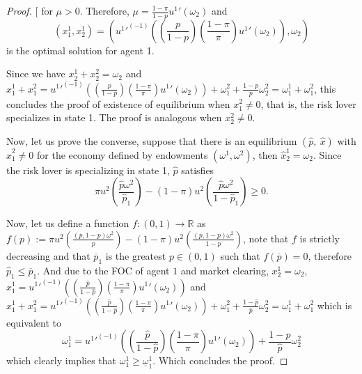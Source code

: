 \documentclass[pdftex]{article}
\numberwithin{equation}{section}
\theoremstyle{th}
\newtheorem{proof lemma}{{Proof Lemma}.}
\theoremstyle{definition}
\begin{document}
{\begin{proof}{[}
for $\mu>0$. Therefore, $\mu=\frac{1-\pi}{1-p}{u^{1}}'(\omega_{2})$
and 
\[
\left(x_{1}^{1},x_{2}^{1}\right)=\left({{u^{1}}'}^{\left(-1\right)}\left(\left(\frac{p}{1-p}\right)\left(\frac{1-\pi}{\pi}\right){u^{1}}'\left(\omega_{2}\right)\right),\omega_{2}\right)
\]
 is the optimal solution for agent 1. 

Since we have $x_{2}^{1}+x_{2}^{2}=\omega_{2}$ and $x_{1}^{1}+x_{1}^{2}={{u^{1}}'}^{\left(-1\right)}\left(\left(\frac{p}{1-p}\right)\left(\frac{1-\pi}{\pi}\right){u^{1}}'\left(\omega_{2}\right)\right)+\omega_{1}^{2}+\frac{1-p}{p}\omega_{2}^{2}=\omega_{1}^{1}+\omega_{1}^{2}$,
this concludes the proof of existence of equilibrium when $x_{1}^{2}\neq0$,
that is, the risk lover specializes in state 1. The proof is analogous
when $x_{2}^{2}\neq0$.

Now, let us prove the converse, suppose that there is an equilibrium
$\left(\hat{p},\ \hat{x}\right)$ with $\hat{x}_{1}^{2}\neq0$ for
the economy defined by endowments $\left(\omega^{1},\omega^{2}\right)$,
then $\hat{x}_{2}^{1}=\omega_{2}$. Since the risk lover is specializing
in state 1, $\hat{p}$ satisfies 
\[
\pi{u}^{2}\left(\frac{\hat{p}\omega^{2}}{\hat{p}_{1}}\right)-(1-\pi){u}^{2}\left(\frac{\hat{p}\omega^{2}}{1-\hat{p}_{1}}\right)\geq0.
\]

Now, let us define a function $f:(0,1)\rightarrow\mathbb{R}$ as $f(p):=\pi{u}^{2}\left(\frac{\left({p},1-{p}\right)\omega^{2}}{{p}}\right)-(1-\pi){u}^{2}\left(\frac{\left({p},1-{p}\right)\omega^{2}}{1-{p}}\right)$,
note that $f$ is strictly decreasing and that $\overline{p}_{1}$
is the greatest $p\in(0,1)$ such that $f(\overline{p})=0$, therefore
$\hat{p}_{1}\leq\overline{p}_{1}$. And due to the FOC of agent $1$
and market clearing, $x_{2}^{1}=\omega_{2}$, $x_{1}^{1}={{u^{1}}'}^{\left(-1\right)}\left(\left(\frac{\hat{p}}{1-\hat{p}}\right)\left(\frac{1-\pi}{\pi}\right){u^{1}}'\left(\omega_{2}\right)\right)$
and $x_{1}^{1}+x_{1}^{2}={{u^{1}}'}^{\left(-1\right)}\left(\left(\frac{\hat{p}}{1-\hat{p}}\right)\left(\frac{1-\pi}{\pi}\right){u^{1}}'\left(\omega_{2}\right)\right)+\omega_{1}^{2}+\frac{1-\hat{p}}{\hat{p}}\omega_{2}^{2}=\omega_{1}^{1}+\omega_{1}^{2}$
which is equivalent to 
\[
\omega_{1}^{1}={{u^{1}}'}^{\left(-1\right)}\left(\left(\frac{\hat{p}}{1-\hat{p}}\right)\left(\frac{1-\pi}{\pi}\right){u^{1}}'\left(\omega_{2}\right)\right)+\frac{1-\hat{p}}{\hat{p}}\omega_{2}^{2}
\]
which clearly implies that $\omega_{1}^{1}\geq\underline{\omega}_{1}^{1}$.
Which concludes the proof. 


\end{proof}}
\end{document}
